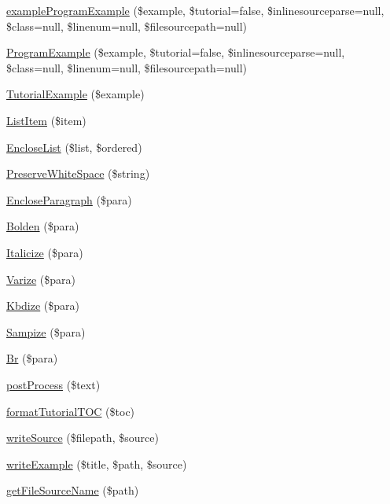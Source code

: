 \begin{DoxyCompactItemize}
\hyperlink{class_converter_a90bd929419af790cfba62346436c27a1}{example\-Program\-Example} (\$example, \$tutorial=false, \$inlinesourceparse=null, \$class=null, \$linenum=null, \$filesourcepath=null)
\item 
\hyperlink{class_converter_a50aa5ec756e883826c3c06cf65ce61a5}{\-Program\-Example} (\$example, \$tutorial=false, \$inlinesourceparse=null, \$class=null, \$linenum=null, \$filesourcepath=null)
\item 
\hyperlink{class_converter_aeb023df705aa419245272dd0face61ed}{\-Tutorial\-Example} (\$example)
\item 
\hyperlink{class_converter_aaf56973a19e15192e0b5c94666c3c925}{\-List\-Item} (\$item)
\item 
\hyperlink{class_converter_ae8e7c8b02a0410b9353c08303be400b8}{\-Enclose\-List} (\$list, \$ordered)
\item 
\hyperlink{class_converter_a94ba8968fdf93aced6fd0b712860315d}{\-Preserve\-White\-Space} (\$string)
\item 
\hyperlink{class_converter_ab6af0b1faac1e635456f9c92ca20ebe4}{\-Enclose\-Paragraph} (\$para)
\item 
\hyperlink{class_converter_a01ca0755f34833af8c7f612b5443bb4d}{\-Bolden} (\$para)
\item 
\hyperlink{class_converter_ae86737e1b3c05277bdd56723bc821c7d}{\-Italicize} (\$para)
\item 
\hyperlink{class_converter_ab5014a0099a471ee2670502b8906484f}{\-Varize} (\$para)
\item 
\hyperlink{class_converter_a08cf61c157a1d774be4c962ddc751ed9}{\-Kbdize} (\$para)
\item 
\hyperlink{class_converter_a4b343b673401649ba437fd9aea0b302a}{\-Sampize} (\$para)
\item 
\hyperlink{class_converter_a18b91c5b86ba04bf5a54fbd2d49e0b35}{\-Br} (\$para)
\item 
\hyperlink{class_converter_a0b2058070d303b4d06535be248b021ab}{post\-Process} (\$text)
\item 
\hyperlink{class_converter_a8207fcf7f5bfbbc02a865ef39b03921a}{format\-Tutorial\-T\-O\-C} (\$toc)
\item 
\hyperlink{class_converter_a9738e16e09b4e0ebe138c7a5d7ec610d}{write\-Source} (\$filepath, \$source)
\item 
\hyperlink{class_converter_a757f70385404e298a4c053d6b7d1be28}{write\-Example} (\$title, \$path, \$source)
\item 
\hyperlink{class_converter_a1cfcc31b22d5dd1c40399536f6cc8f76}{get\-File\-Source\-Name} (\$path)

\end{DoxyCompactItemize}
